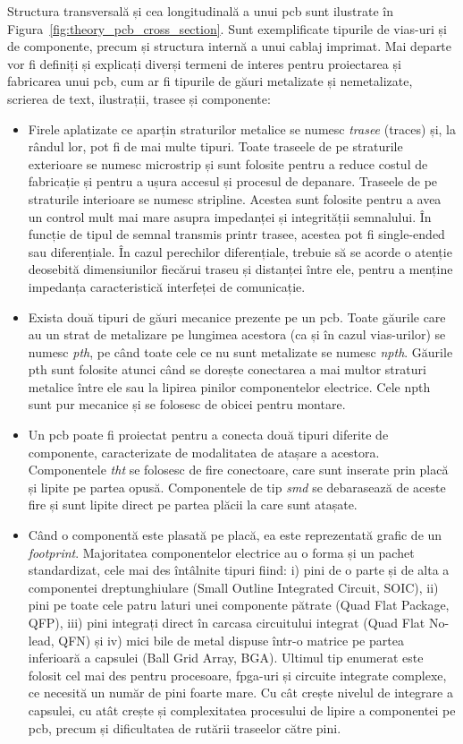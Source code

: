 \documentclass[12pt,a4paper]{report}
\begin{document}
Structura transversală și cea longitudinală a unui \gls{pcb} sunt ilustrate în Figura~\ref{fig:theory_pcb_cross_section}. Sunt exemplificate tipurile de vias-uri și de componente, precum și structura internă a unui cablaj imprimat. Mai departe vor fi definiți și explicați diverși termeni de interes pentru proiectarea și fabricarea unui \gls{pcb}, cum ar fi tipurile de găuri metalizate și nemetalizate, scrierea de text, ilustrații, trasee și componente:
\begin{itemize}
\item Firele aplatizate ce aparțin straturilor metalice se numesc \textit{trasee} (traces) și, la rândul lor, pot fi de mai multe tipuri. Toate traseele de pe straturile exterioare se numesc microstrip și sunt folosite pentru a reduce costul de fabricație și pentru a ușura accesul și procesul de depanare. Traseele de pe straturile interioare se numesc stripline. Acestea sunt folosite pentru a avea un control mult mai mare asupra impedanței și integrității semnalului. În funcție de tipul de semnal transmis printr trasee, acestea pot fi single-ended sau diferențiale. În cazul perechilor diferențiale, trebuie să se acorde o atenție deosebită dimensiunilor fiecărui traseu și distanței între ele, pentru a menține impedanța caracteristică interfeței de comunicație.
\item Exista două tipuri de găuri mecanice prezente pe un \gls{pcb}. Toate găurile care au un strat de metalizare pe lungimea acestora (ca și în cazul vias-urilor) se numesc \textit{\gls{pth}}, pe când toate cele ce nu sunt metalizate se numesc \textit{\gls{npth}}. Găurile \gls{pth} sunt folosite atunci când se dorește conectarea a mai multor straturi metalice între ele sau la lipirea pinilor componentelor electrice. Cele \gls{npth} sunt pur mecanice și se folosesc de obicei pentru montare.
\item Un \gls{pcb} poate fi proiectat pentru a conecta două tipuri diferite de componente, caracterizate de modalitatea de atașare a acestora. Componentele \textit{\gls{tht}} se folosesc de fire conectoare, care sunt inserate prin placă și lipite pe partea opusă. Componentele de tip \textit{\gls{smd}} se debarasează de aceste fire și sunt lipite direct pe partea plăcii la care sunt atașate.
\item Când o componentă este plasată pe placă, ea este reprezentată grafic de un \textit{footprint}. Majoritatea componentelor electrice au o forma și un pachet standardizat, cele mai des întâlnite tipuri fiind: i) pini de o parte și de alta a componentei dreptunghiulare (Small Outline Integrated Circuit, SOIC), ii) pini pe toate cele patru laturi unei componente pătrate (Quad Flat Package, QFP), iii) pini integrați direct în carcasa circuitului integrat (Quad Flat No-lead, QFN) și iv) mici bile de metal dispuse într-o matrice pe partea inferioară a capsulei (Ball Grid Array, BGA). Ultimul tip enumerat este folosit cel mai des pentru procesoare, \gls{fpga}-uri și circuite integrate complexe, ce necesită un număr de pini foarte mare. Cu cât crește nivelul de integrare a capsulei, cu atât crește și complexitatea procesului de lipire a componentei pe \gls{pcb}, precum și dificultatea de rutării traseelor către pini.

\end{itemize}
\end{document}
